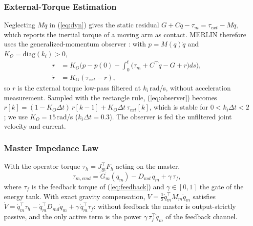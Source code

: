 \documentclass[a4paper, 10pt, conference]{ieeeconf}      %
\begin{document}
\subsubsection{External-Torque Estimation}
Neglecting $M\ddot q$ in (\ref{eq:dyn}) gives the static residual $G+C\dot q-\tau_m=\tau_{ext}-M\ddot q$, which reports the inertial torque of a moving arm as contact. MERLIN therefore uses the generalized-momentum observer \cite{delucamattone2003}: with $p=M(q)\dot q$ and $K_O=\mathrm{diag}(k_i)>0$,
\begin{equation}
\begin{aligned}
r&=K_O\Big(p-p(0)-\!\int_0^t\!\big(\tau_m+C^{\top}\dot q-G+r\big)ds\Big),\\
\dot r&=K_O(\tau_{ext}-r),
\end{aligned}
\label{eq:observer}
\end{equation}
so $r$ is the external torque low-pass filtered at $k_i$\,rad/s, without acceleration measurement. Sampled with the rectangle rule, (\ref{eq:observer}) becomes $r[k]=(1-K_O\Delta t)\,r[k-1]+K_O\Delta t\,\tau_{ext}[k]$, which is stable for $0<k_i\Delta t<2$; we use $K_O=15$\,rad/s ($k_i\Delta t=0.3$). The observer is fed the unfiltered joint velocity and current.

\subsubsection{Master Impedance Law}
With the operator torque $\tau_h=J_m^{\top}F_h$ acting on the master,
\begin{equation}
\tau_{m,cmd}=\hat G_m(q_m)-D_{md}\,\dot q_m+\gamma\,\tau_f ,
\label{eq:master}
\end{equation}
where $\tau_f$ is the feedback torque of (\ref{eq:feedback}) and $\gamma\in[0,1]$ the gate of the energy tank. With exact gravity compensation, $V=\tfrac12\dot q_m^{\top}M_m\dot q_m$ satisfies
$\dot V=\dot q_m^{\top}\tau_h-\dot q_m^{\top}D_{md}\dot q_m+\gamma\,\dot q_m^{\top}\tau_f$:
without feedback the master is output-strictly passive, and the only active term is the power $\gamma\,\tau_f^{\top}\dot q_m$ of the feedback channel.
\end{document}
